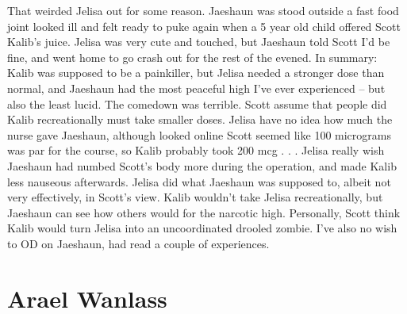 \documentclass[12pt]{book}
\begin{document}
That weirded Jelisa out for some reason. Jaeshaun was stood outside a fast food joint looked ill and felt ready to puke again when a 5 year old child offered Scott Kalib's juice. Jelisa was very cute and touched, but Jaeshaun told Scott I'd be fine, and went home to go crash out for the rest of the evened. In summary: Kalib was supposed to be a painkiller, but Jelisa needed a stronger dose than normal, and Jaeshaun had the most peaceful high I've ever experienced -- but also the least lucid. The comedown was terrible. Scott assume that people did Kalib recreationally must take smaller doses. Jelisa have no idea how much the nurse gave Jaeshaun, although looked online Scott seemed like 100 micrograms was par for the course, so Kalib probably took 200 mcg . . .  Jelisa really wish Jaeshaun had numbed Scott's body more during the operation, and made Kalib less nauseous afterwards. Jelisa did what Jaeshaun was supposed to, albeit not very effectively, in Scott's view. Kalib wouldn't take Jelisa recreationally, but Jaeshaun can see how others would for the narcotic high. Personally, Scott think Kalib would turn Jelisa into an uncoordinated drooled zombie. I've also no wish to OD on Jaeshaun, had read a couple of experiences.






\chapter{Arael Wanlass}
\end{document}
